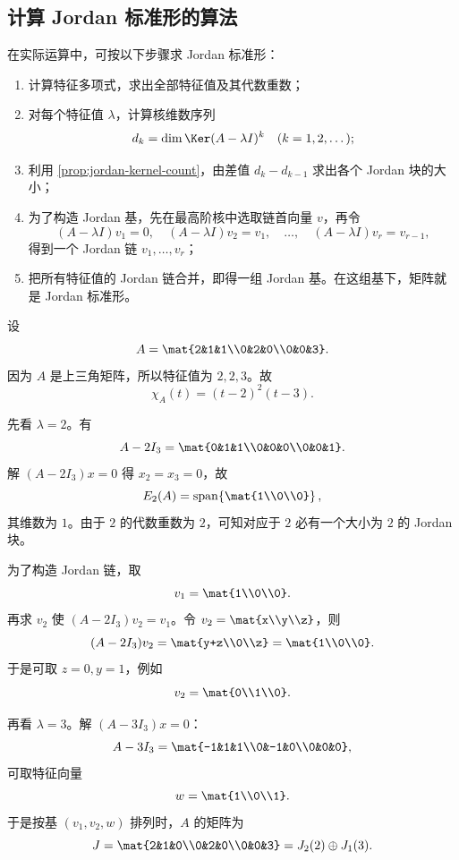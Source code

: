 \subsection{计算 Jordan 标准形的算法}

在实际运算中，可按以下步骤求 Jordan 标准形：

\begin{enumerate}[label=\arabic*., leftmargin=2.4em]
  \item 计算特征多项式，求出全部特征值及其代数重数；
  \item 对每个特征值 \(\lambda\)，计算核维数序列
  \[
  d_k=\dim \Ker(A-\lambda I)^k \quad (k=1,2,\dots);
  \]
  \item 利用 \cref{prop:jordan-kernel-count}，由差值 \(d_k-d_{k-1}\) 求出各个 Jordan 块的大小；
  \item 为了构造 Jordan 基，先在最高阶核中选取链首向量 \(v\)，再令
  \[
  (A-\lambda I)v_1=0,\quad (A-\lambda I)v_2=v_1,\quad \dots,\quad (A-\lambda I)v_r=v_{r-1},
  \]
  得到一个 Jordan 链 \(v_1,\dots,v_r\)；
  \item 把所有特征值的 Jordan 链合并，即得一组 Jordan 基。在这组基下，矩阵就是 Jordan 标准形。
\end{enumerate}

\begin{example}[一个 \(3\times 3\) 例子]\label{ex:jordan-3x3}
设
\[
A=\mat{2&1&1\\0&2&0\\0&0&3}.
\]
因为 \(A\) 是上三角矩阵，所以特征值为 \(2,2,3\)。故
\[
\chi_A(t)=(t-2)^2(t-3).
\]

先看 \(\lambda=2\)。有
\[
A-2I_3=\mat{0&1&1\\0&0&0\\0&0&1}.
\]
解 \((A-2I_3)x=0\) 得 \(x_2=x_3=0\)，故
\[
E_2(A)=\operatorname{span}\!\left\{\mat{1\\0\\0}\right\},
\]
其维数为 \(1\)。由于 \(2\) 的代数重数为 \(2\)，可知对应于 \(2\) 必有一个大小为 \(2\) 的 Jordan 块。

为了构造 Jordan 链，取
\[
v_1=\mat{1\\0\\0}.
\]
再求 \(v_2\) 使 \((A-2I_3)v_2=v_1\)。令 \(v_2=\mat{x\\y\\z}\)，则
\[
(A-2I_3)v_2=\mat{y+z\\0\\z}=\mat{1\\0\\0}.
\]
于是可取 \(z=0,y=1\)，例如
\[
v_2=\mat{0\\1\\0}.
\]

再看 \(\lambda=3\)。解 \((A-3I_3)x=0\)：
\[
A-3I_3=\mat{-1&1&1\\0&-1&0\\0&0&0},
\]
可取特征向量
\[
w=\mat{1\\0\\1}.
\]
于是按基 \((v_1,v_2,w)\) 排列时，\(A\) 的矩阵为
\[
J=\mat{2&1&0\\0&2&0\\0&0&3}=J_2(2)\oplus J_1(3).
\]
\end{example}

